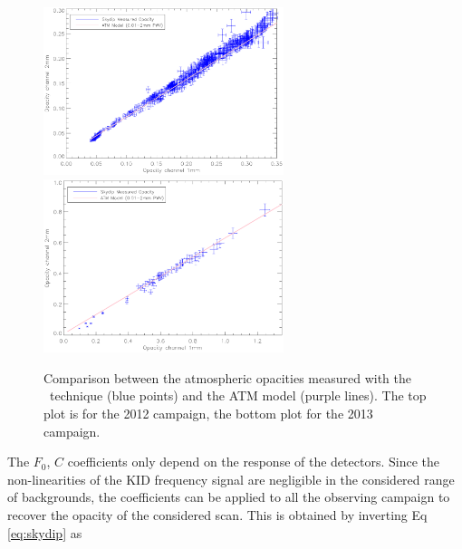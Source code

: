 \begin{figure}[t!]
\begin{center}
\includegraphics[width=7cm]{figures/skydipvsATM_run5.ps} \\
\includegraphics[width=7cm]{figures/skydipvsATM_run6.ps}
\end{center}
\caption{Comparison between the atmospheric opacities measured with the \Skydip\ technique
  (blue points) and the ATM model (purple lines). The top plot is for the 2012
  campaign, the bottom plot for the 2013 campaign.}
\label{fig:skydipvsmodel}
\end{figure} 




The $F_0$, $C$ coefficients only depend on the response of the detectors.
Since the non-linearities of the KID frequency signal are negligible in the
considered range of backgrounds, the coefficients can be applied to all the
observing campaign to recover the opacity of the considered scan. This is
obtained by inverting Eq \ref{eq:skydip} as

